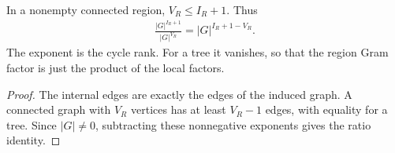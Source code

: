 \begin{lemma}%
    \label{thm:peps_regular_region_cycle_exponent}
    \leanok
    In a nonempty connected region, $V_R\leq I_R+1$. Thus
    \begin{align}
        \frac{|G|^{I_R+1}}{|G|^{V_R}}
        =|G|^{I_R+1-V_R}.
    \end{align}
    The exponent is the cycle rank. For a tree it vanishes, so that
    the region Gram factor is just the product of the local factors.
\end{lemma}
\begin{proof}\leanok
    The internal edges are exactly the edges of the induced graph.
    A connected graph with $V_R$ vertices has at least $V_R-1$ edges,
    with equality for a tree. Since $|G|\ne0$, subtracting these
    nonnegative exponents gives the ratio identity.
\end{proof}

